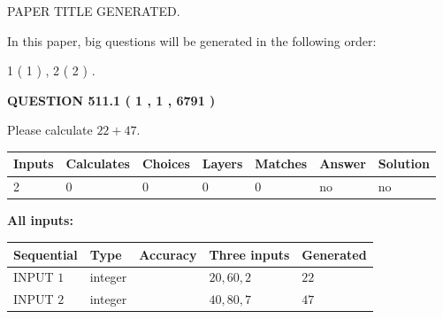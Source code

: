 \documentclass[12pt]{article}
\begin{document}
   
\vspace{0.2in}
   
   
   
   
   
   
   
   
 \vspace{0.2in}
 
 
 
 
   
   
 PAPER TITLE GENERATED.
   
   
   
\vspace{0.2in}
   
In this paper, big questions will be generated in the following order: 
   
   
   1 ( 1 )
 ,
   2 ( 2 )
 .
  
\vspace{0.2in}
  
{\textbf{\Large{QUESTION
511.1 
 ( 1 , 1 , 6791 )
}}}
  
  
 
Please calculate $ %
22 +  %
47 $.
 
 
   
   
   
   
\noindent\begin{tabular}{|l|l|l|l|l|l|l|}
 \hline
Inputs & Calculates & Choices & Layers & Matches & Answer & Solution \\ \hline
 2  & 
 0  & 
 0
  & 
 0  & 
 0  & 
  no & 
  no 
  \\ \hline
 \end{tabular}
   
   
   
   
\noindent{}
   
   
   
   
\noindent\vspace{0.1in}\hspace{-0.08in} {\textbf{\Large{All inputs: }}}
   
   
  
  
\noindent\begin{tabular}{|l|l|l|l|l|}
\hline
 Sequential & Type & Accuracy & Three inputs & Generated \\ 
\hline
 
 
  INPUT $  1 $ & integer &  & $
 20
 , 
 60
 , 
 2
 $ & $ 22 $ 
 \\  \hline  
 
 
  INPUT $  2 $ & integer &  & $
 40
 , 
 80
 , 
 7
 $ & $ 47 $ 
 \\  \hline  
 \end{tabular}
   
\end{document}
